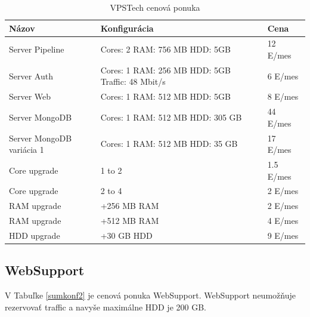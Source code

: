 \documentclass[11pt]{article}
\begin{document}
\begin{table}[htp]
\centering
\begin{tabular}{|l|p{4cm}|l|}
\hline
	Názov & Konfigurácia & Cena \\
\hline
	Server Pipeline & 
	Cores: 2 \newline
	RAM: 756 MB \newline
	HDD: 5GB
	& 12 E/mes
	\\
\hline
	Server Auth &
	Cores: 1 \newline
	RAM: 256 MB \newline
	HDD: 5GB \newline
	Traffic: 48 Mbit/s
	& 6 E/mes
	\\
\hline
	Server Web &
	Cores: 1 \newline
	RAM: 512 MB \newline
	HDD: 5GB
	& 8 E/mes
	\\
\hline
	Server MongoDB &
	Cores: 1 \newline
	RAM: 512 MB \newline
	HDD: 305 GB
	& 44 E/mes
	\\
\hline
	Server MongoDB variácia 1 &
	Cores: 1 \newline
	RAM: 512 MB \newline
	HDD: 35 GB
	& 17 E/mes
	\\
	
\hline
	Core upgrade  & 1 to 2 & 1.5 E/mes \\
\hline
	Core upgrade  & 2 to 4 & 2 E/mes \\
\hline
	RAM upgrade & +256 MB RAM & 2 E/mes \\
\hline
	RAM upgrade & +512 MB RAM & 4 E/mes \\
\hline
	HDD upgrade & +30 GB HDD & 9 E/mes \\
\hline
\end{tabular}

\caption{VPSTech cenová ponuka}
\label{sumkonf}
\end{table}



\subsection{WebSupport}

V Tabuľke \ref{sumkonf2} je cenová ponuka WebSupport. WebSupport neumožňuje rezervovať traffic a navyše maximálne HDD je 200 GB.  
\end{document}
